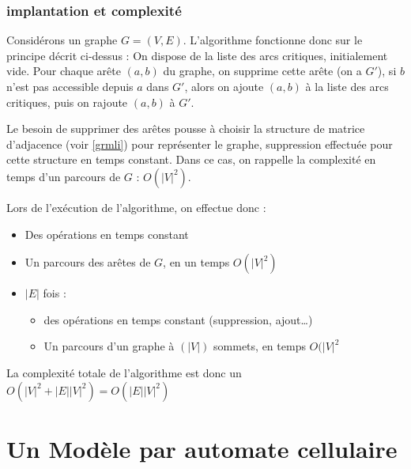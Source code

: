 \documentclass[11pt]{article}
\begin{document}
		\subsubsection{implantation et complexité}
	Considérons un graphe $G=(V,E)$. L'algorithme fonctionne donc sur le principe décrit ci-dessus : On dispose de la liste des arcs critiques, initialement vide. Pour chaque arête $(a,b)$ du graphe, on supprime cette arête (on a $G\prime$), si $b$ n'est pas accessible depuis $a$ dans $G\prime$, alors on ajoute $(a,b)$ à la liste des arcs critiques, puis on rajoute $(a,b)$ à $G\prime$.\par 
Le besoin de supprimer des arêtes pousse à choisir la structure de matrice d'adjacence (voir \ref{grmli}) pour représenter le graphe, suppression effectuée pour cette structure en temps constant. Dans ce cas, on rappelle la complexité en temps d'un parcours de $G$ : $O(|V|^2)$. \par 
Lors de l'exécution de l'algorithme, on effectue donc :
\begin{itemize}
	\item Des opérations en temps constant
	\item Un parcours des arêtes de $G$, en un temps $O(|V|^2)$
	\item $|E|$ fois :
	\begin{itemize}
		\item des opérations en temps constant (suppression, ajout…)
		\item Un parcours d'un graphe à $(|V|)$ sommets, en temps $O(|V|^2$
	\end{itemize}
\end{itemize}

La complexité totale de l'algorithme est donc un $O(|V|^2 + |E||V|^2) = O(|E||V|^2)$

\section{Un Modèle par automate cellulaire}
\end{document}
